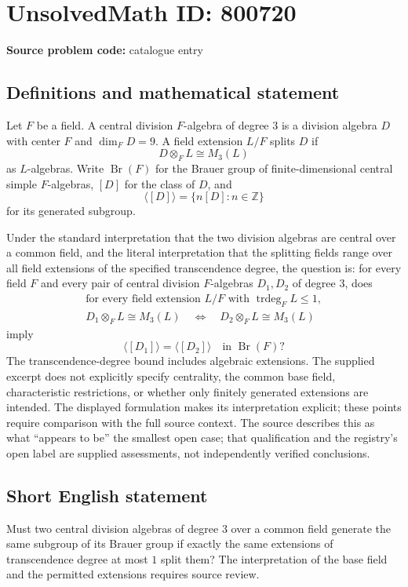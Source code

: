 \documentclass[11pt]{article}
\newcommand{\Z}{\mathbb{Z}}
\begin{document}
\section*{UnsolvedMath ID: 800720}
\textbf{Source problem code:} catalogue entry
\subsection{Definitions and mathematical statement}
Let \(F\) be a field. A central division \(F\)-algebra of degree \(3\) is a division algebra \(D\) with center \(F\) and \(\dim_F D=9\). A field extension \(L/F\) splits \(D\) if
\[
D\otimes_F L\cong M_3(L)
\]
as \(L\)-algebras. Write \(\operatorname{Br}(F)\) for the Brauer group of finite-dimensional central simple \(F\)-algebras, \([D]\) for the class of \(D\), and
\[
\langle[D]\rangle=\{n[D]:n\in\Z\}
\]
for its generated subgroup.

Under the standard interpretation that the two division algebras are central over a common field, and the literal interpretation that the splitting fields range over all field extensions of the specified transcendence degree, the question is: for every field \(F\) and every pair of central division \(F\)-algebras \(D_1,D_2\) of degree \(3\), does
\[
\begin{gathered}
\text{for every field extension }L/F\text{ with }\operatorname{trdeg}_F L\leq 1,\\
D_1\otimes_F L\cong M_3(L)
\quad\Longleftrightarrow\quad
D_2\otimes_F L\cong M_3(L)
\end{gathered}
\]
imply
\[
\langle[D_1]\rangle=\langle[D_2]\rangle
\quad\text{in }\operatorname{Br}(F)?
\]
The transcendence-degree bound includes algebraic extensions. The supplied excerpt does not explicitly specify centrality, the common base field, characteristic restrictions, or whether only finitely generated extensions are intended. The displayed formulation makes its interpretation explicit; these points require comparison with the full source context. The source describes this as what ``appears to be'' the smallest open case; that qualification and the registry's open label are supplied assessments, not independently verified conclusions.
\subsection{Short English statement}
Must two central division algebras of degree \(3\) over a common field generate the same subgroup of its Brauer group if exactly the same extensions of transcendence degree at most \(1\) split them? The interpretation of the base field and the permitted extensions requires source review.
\end{document}
